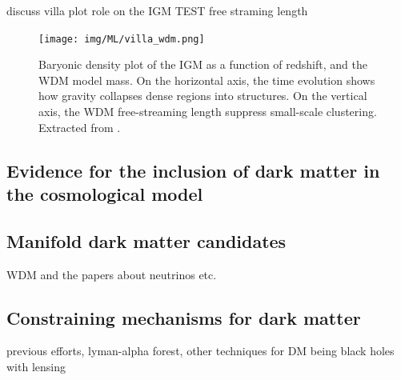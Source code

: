 discuss villa plot 
role on the IGM
TEST
free straming length
\begin{figure}
    \centering
    \texttt{[image: img/ML/villa\_wdm.png]}
    \caption{Baryonic density plot of the IGM as a function of redshift, and the WDM model mass. On the horizontal axis, the time evolution shows how gravity collapses dense regions into structures. On the vertical axis, the WDM free-streaming length suppress small-scale clustering. Extracted from \cite{Villasenor_2023}.}
    \label{fig:villasenor_wdm}
\end{figure}

\subsection{Evidence for the inclusion of dark matter in the cosmological model}
\subsection{Manifold dark matter candidates}
WDM and the papers about neutrinos etc.
\subsection{Constraining mechanisms for dark matter}
previous efforts, lyman-alpha forest, other techniques for DM being black holes with lensing 

